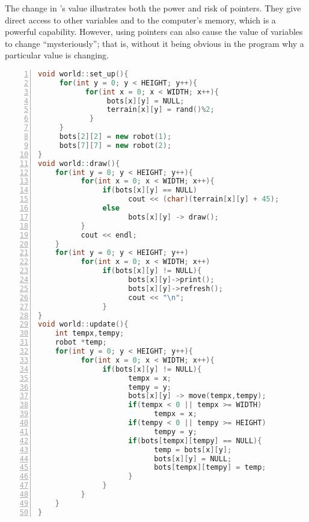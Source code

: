 The change in 's value illustrates both the power and risk of pointers.  They give direct access to other variables and to the computer's memory, which is a powerful capability.  However, using pointers can also cause the value of variables to change ``mysteriously''; that is, without it being obvious in the program why a particular value is changing.  


\begin{minipage}{\textwidth}
\renewcommand*\thelstnumber{\the\value{lstnumber}d}
\begin{lstlisting}[language=C++,numbers = left,xleftmargin=4.0ex, basicstyle=\small, emph={x,y,bots,terrain,tempx,tempy,temp},emphstyle = \color{\mycolor},
showstringspaces=false,
caption = {Definitions of the member functions of the \cf{world} class.},
label={listing:worldcpp}]
void world::set_up(){
     for(int y = 0; y < HEIGHT; y++){
           for(int x = 0; x < WIDTH; x++){
                bots[x][y] = NULL;
                terrain[x][y] = rand()%2;
            }
     }
     bots[2][2] = new robot(1);
     bots[7][7] = new robot(2);
}
void world::draw(){
    for(int y = 0; y < HEIGHT; y++){
          for(int x = 0; x < WIDTH; x++){
               if(bots[x][y] == NULL)
                     cout << (char)(terrain[x][y] + 45);
               else
                     bots[x][y] -> draw();
          }
          cout << endl;
    }
    for(int y = 0; y < HEIGHT; y++)
          for(int x = 0; x < WIDTH; x++)
               if(bots[x][y] != NULL){
                     bots[x][y]->print();
                     bots[x][y]->refresh();	
                     cout << "\n";
               }
}
void world::update(){
    int tempx,tempy;
    robot *temp;
    for(int y = 0; y < HEIGHT; y++){
          for(int x = 0; x < WIDTH; x++){
               if(bots[x][y] != NULL){
                     tempx = x;
                     tempy = y;
                     bots[x][y] -> move(tempx,tempy);
                     if(tempx < 0 || tempx >= WIDTH)
                           tempx = x;
                     if(tempy < 0 || tempy >= HEIGHT)
                           tempy = y;
                     if(bots[tempx][tempy] == NULL){
                           temp = bots[x][y];
                           bots[x][y] = NULL;
                           bots[tempx][tempy] = temp;
                     }  
               }
          }
    }
}
\end{lstlisting}
\end{minipage}

